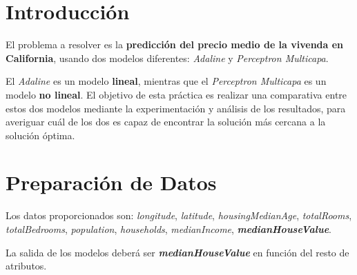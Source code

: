 \documentclass{uc3mpracticas}
\begin{document}
  \frontmatter



  \vspace{55mm}


  \newpage

  \tableofcontents

  \newpage

  \mainmatter

  \section{Introducción}

  El problema a resolver es la \textbf{predicción del precio medio de la vivenda en California}, usando dos modelos diferentes: \textit{Adaline} y \textit{Perceptron Multicapa}.

  \vspace{3mm}

  El \textit{Adaline} es un modelo \textbf{lineal}, mientras que el \textit{Perceptron Multicapa} es un modelo \textbf{no lineal}. El objetivo de esta práctica es realizar una comparativa entre estos dos modelos mediante la experimentación y análisis de los resultados, para averiguar cuál de los dos es capaz de encontrar la solución más cercana a la solución óptima.

  \section{Preparación de Datos}

  Los datos proporcionados son: \textit{longitude}, \textit{latitude}, \textit{housingMedianAge}, \textit{totalRooms}, \textit{totalBedrooms}, \textit{population}, \textit{households}, \textit{medianIncome}, \textit{\textbf{medianHouseValue}}.

  \vspace{3mm}

  La salida de los modelos deberá ser \textit{\textbf{medianHouseValue}} en función del resto de atributos.

  \vspace{2mm}
\end{document}
